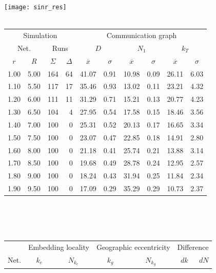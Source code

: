 \documentclass{article}
\begin{document}
\begin{figure}[h]
\begin{center}
\texttt{[image: sinr\_res]}
~\\~\\
\begin{tabular}{|rr|rr|rr|rr|rr|}
\hline
\multicolumn{4}{|c|}{Simulation} & \multicolumn{6}{|c|}{Communication graph}\\
\multicolumn{2}{|c}{Net.} & \multicolumn{2}{c|}{Runs} & \multicolumn{2}{|c}{$D$} & \multicolumn{2}{c}{$N_1$} & \multicolumn{2}{c|}{$k_T$}\\
\hline
\multicolumn{1}{|c}{$r$} & \multicolumn{1}{c|}{$R$} & \multicolumn{1}{|c}{$\Sigma$} & \multicolumn{1}{c|}{$\Delta$} & \multicolumn{1}{|c}{$\overline{x}$} & \multicolumn{1}{c|}{$\sigma$} & \multicolumn{1}{|c}{$\overline{x}$} & \multicolumn{1}{c|}{$\sigma$} & \multicolumn{1}{|c}{$\overline{x}$} & \multicolumn{1}{c|}{$\sigma$}\\
1.00 & 5.00 & 164 & 64 & 41.07 & 0.91 & 10.98 & 0.09 & 26.11 & 6.03\\
1.10 & 5.50 & 117 & 17 & 35.46 & 0.93 & 13.02 & 0.11 & 23.21 & 4.32\\
1.20 & 6.00 & 111 & 11 & 31.29 & 0.71 & 15.21 & 0.13 & 20.77 & 4.23\\
1.30 & 6.50 & 104 &  4 & 27.95 & 0.54 & 17.58 & 0.15 & 18.46 & 3.56\\
1.40 & 7.00 & 100 &  0 & 25.31 & 0.52 & 20.13 & 0.17 & 16.65 & 3.34\\
1.50 & 7.50 & 100 &  0 & 23.07 & 0.47 & 22.85 & 0.18 & 14.91 & 2.80\\
1.60 & 8.00 & 100 &  0 & 21.18 & 0.41 & 25.74 & 0.21 & 13.88 & 3.14\\
1.70 & 8.50 & 100 &  0 & 19.68 & 0.49 & 28.78 & 0.24 & 12.95 & 2.57\\
1.80 & 9.00 & 100 &  0 & 18.24 & 0.43 & 31.94 & 0.25 & 11.84 & 2.34\\
1.90 & 9.50 & 100 &  0 & 17.09 & 0.29 & 35.29 & 0.29 & 10.73 & 2.37\\
\hline
\end{tabular}\\
~\\~\\
\begin{tabular}{|r|rr|rr|rr|rr|rr|}
\hline
& \multicolumn{4}{|c|}{Embedding locality} & \multicolumn{4}{|c|}{Geographic eccentricity} & \multicolumn{2}{|c|}{Difference}\\
Net. & \multicolumn{2}{c}{$k_e$} & \multicolumn{2}{c|}{$N_{k_e}$} & \multicolumn{2}{c}{$k_g$} & \multicolumn{2}{c|}{$N_{k_g}$}& $dk$ & $dN$\\

\end{tabular}
\end{center}
\end{figure}
\end{document}
